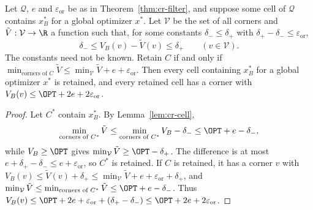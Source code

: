 \begin{proposition}\label{prop:cr-osc}
Let $\mathcal Q$, $e$ and $\varepsilon_{\mathrm{or}}$ be as in Theorem~\ref{thm:cr-filter}, and
suppose some cell of $\mathcal Q$ contains $x^*_B$ for a global optimizer
$x^*$. Let $\mathcal V$ be the set of all corners and
$\tilde V:\mathcal V\to\R$ a function such that, for some constants
$\delta_-\le\delta_+$ with $\delta_+-\delta_-\le\varepsilon_{\mathrm{or}}$,
\[
\delta_-\le V_B(v)-\tilde V(v)\le\delta_+\qquad(v\in\mathcal V).
\]
The constants need not be known. Retain $C$ if and only if
$\min_{\text{corners of }C}\tilde V\le\min_{\mathcal V}\tilde V+e+\varepsilon_{\mathrm{or}}$.
Then every cell containing $x^*_B$ for a global optimizer $x^*$ is
retained, and every retained cell has a corner with
$V_B(v)\le\OPT+2e+2\varepsilon_{\mathrm{or}}$.
\end{proposition}

\begin{proof}
Let $C^*$ contain $x^*_B$. By Lemma~\ref{lem:cr-cell},
\[
\min_{\text{corners of }C^*}\tilde V\le\min_{\text{corners of }C^*}V_B-\delta_-
\le\OPT+e-\delta_-,
\]
while $V_B\ge\OPT$ gives $\min_{\mathcal V}\tilde V\ge\OPT-\delta_+$. The
difference is at most $e+\delta_+-\delta_-\le e+\varepsilon_{\mathrm{or}}$, so $C^*$ is retained.
If $C$ is retained, it has a corner $v$ with
$V_B(v)\le\tilde V(v)+\delta_+\le\min_{\mathcal V}\tilde V+e+\varepsilon_{\mathrm{or}}+\delta_+$, and
$\min_{\mathcal V}\tilde V\le\min_{\text{corners of }C^*}\tilde V\le\OPT+e-\delta_-$.
Thus $V_B(v)\le\OPT+2e+\varepsilon_{\mathrm{or}}+(\delta_+-\delta_-)\le\OPT+2e+2\varepsilon_{\mathrm{or}}$.
\end{proof}

